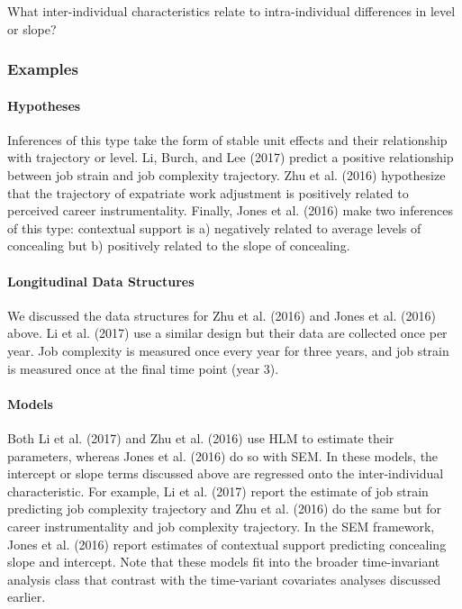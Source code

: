 \documentclass[english,,man]{apa6}
\let\oldparagraph\paragraph
\renewcommand{\paragraph}[1]{\oldparagraph{#1}\mbox{}}
\theoremstyle{definition}
\theoremstyle{definition}
\theoremstyle{definition}
\theoremstyle{remark}
\begin{document}
What inter-individual characteristics relate to intra-individual
differences in level or slope?

\hypertarget{examples-5}{%
\subsubsection{Examples}\label{examples-5}}

\hypertarget{hypotheses-5}{%
\paragraph{Hypotheses}\label{hypotheses-5}}

Inferences of this type take the form of stable unit effects and their
relationship with trajectory or level. Li, Burch, and Lee (2017) predict
a positive relationship between job strain and job complexity
trajectory. Zhu et al. (2016) hypothesize that the trajectory of
expatriate work adjustment is positively related to perceived career
instrumentality. Finally, Jones et al. (2016) make two inferences of
this type: contextual support is a) negatively related to average levels
of concealing but b) positively related to the slope of concealing.

\hypertarget{longitudinal-data-structures}{%
\paragraph{Longitudinal Data
Structures}\label{longitudinal-data-structures}}

We discussed the data structures for Zhu et al. (2016) and Jones et al.
(2016) above. Li et al. (2017) use a similar design but their data are
collected once per year. Job complexity is measured once every year for
three years, and job strain is measured once at the final time point
(year 3).

\hypertarget{models-5}{%
\paragraph{Models}\label{models-5}}

Both Li et al. (2017) and Zhu et al. (2016) use HLM to estimate their
parameters, whereas Jones et al. (2016) do so with SEM. In these models,
the intercept or slope terms discussed above are regressed onto the
inter-individual characteristic. For example, Li et al. (2017) report
the estimate of job strain predicting job complexity trajectory and Zhu
et al. (2016) do the same but for career instrumentality and job
complexity trajectory. In the SEM framework, Jones et al. (2016) report
estimates of contextual support predicting concealing slope and
intercept. Note that these models fit into the broader time-invariant
analysis class that contrast with the time-variant covariates analyses
discussed earlier.
\end{document}
